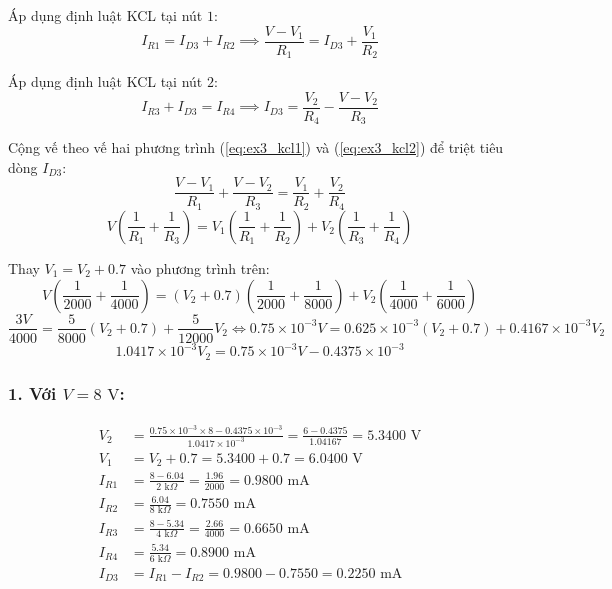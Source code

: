 \noindent Áp dụng định luật KCL tại nút $1$:
\begin{equation}
  I_{R1} = I_{D3} + I_{R2} \implies \frac{V - V_1}{R_1} = I_{D3} + \frac{V_1}{R_2} \label{eq:ex3_kcl1}
\end{equation}

\noindent Áp dụng định luật KCL tại nút $2$:
\begin{equation}
  I_{R3} + I_{D3} = I_{R4} \implies I_{D3} = \frac{V_2}{R_4} - \frac{V - V_2}{R_3} \label{eq:ex3_kcl2}
\end{equation}

\noindent Cộng vế theo vế hai phương trình (\ref{eq:ex3_kcl1}) và (\ref{eq:ex3_kcl2}) để triệt tiêu dòng $I_{D3}$:
\begin{equation}
  \frac{V - V_1}{R_1} + \frac{V - V_2}{R_3} = \frac{V_1}{R_2} + \frac{V_2}{R_4}
\end{equation}
\begin{equation}
  V\left(\frac{1}{R_1} + \frac{1}{R_3}\right) = V_1\left(\frac{1}{R_1} + \frac{1}{R_2}\right) + V_2\left(\frac{1}{R_3} + \frac{1}{R_4}\right)
\end{equation}

\noindent Thay $V_1 = V_2 + 0.7$ vào phương trình trên:
\begin{equation}
  V\left(\frac{1}{2000} + \frac{1}{4000}\right) = (V_2 + 0.7)\left(\frac{1}{2000} + \frac{1}{8000}\right) + V_2\left(\frac{1}{4000} + \frac{1}{6000}\right)
\end{equation}
\begin{equation}
  \frac{3V}{4000} = \frac{5}{8000}(V_2 + 0.7) + \frac{5}{12000}V_2 \iff 0.75 \times 10^{-3} V = 0.625 \times 10^{-3}(V_2 + 0.7) + 0.4167 \times 10^{-3} V_2
\end{equation}
\begin{equation}
  1.0417 \times 10^{-3} V_2 = 0.75 \times 10^{-3} V - 0.4375 \times 10^{-3}
\end{equation}

\subsubsection*{1. Với $V = 8\text{ V}$:}
\begin{align*}
  V_2 &= \frac{0.75 \times 10^{-3} \times 8 - 0.4375 \times 10^{-3}}{1.0417 \times 10^{-3}} = \frac{6 - 0.4375}{1.04167} = 5.3400\text{ V} \\
  V_1 &= V_2 + 0.7 = 5.3400 + 0.7 = 6.0400\text{ V} \\
  I_{R1} &= \frac{8 - 6.04}{2\text{ k}\Omega} = \frac{1.96}{2000} = 0.9800\text{ mA} \\
  I_{R2} &= \frac{6.04}{8\text{ k}\Omega} = 0.7550\text{ mA} \\
  I_{R3} &= \frac{8 - 5.34}{4\text{ k}\Omega} = \frac{2.66}{4000} = 0.6650\text{ mA} \\
  I_{R4} &= \frac{5.34}{6\text{ k}\Omega} = 0.8900\text{ mA} \\
  I_{D3} &= I_{R1} - I_{R2} = 0.9800 - 0.7550 = 0.2250\text{ mA}
\end{align*}

